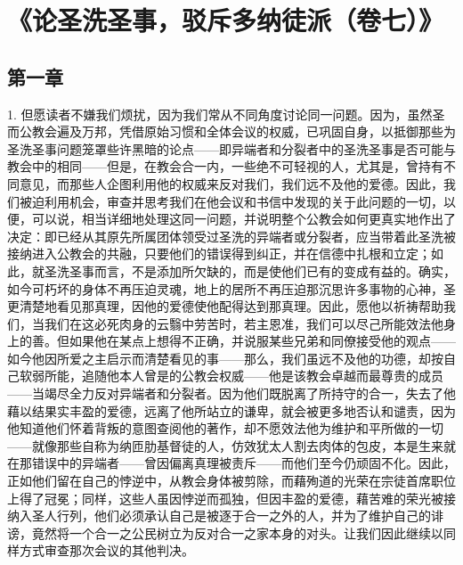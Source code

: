 

\section{《论圣洗圣事，驳斥多纳徒派（卷七）》}

\par


\subsection{第一章}

1. 但愿读者不嫌我们烦扰，因为我们常从不同角度讨论同一问题。因为，虽然圣而公教会遍及万邦，凭借原始习惯和全体会议的权威，已巩固自身，以抵御那些为圣洗圣事问题笼罩些许黑暗的论点——即异端者和分裂者中的圣洗圣事是否可能与教会中的相同——但是，在教会合一内，一些绝不可轻视的人，尤其是，曾持有不同意见，而那些人企图利用他的权威来反对我们，我们远不及他的爱德。因此，我们被迫利用机会，审查并思考我们在他会议和书信中发现的关于此问题的一切，以便，可以说，相当详细地处理这同一问题，并说明整个公教会如何更真实地作出了决定：即已经从其原先所属团体领受过圣洗的异端者或分裂者，应当带着此圣洗被接纳进入公教会的共融，只要他们的错误得到纠正，并在信德中扎根和立定；如此，就圣洗圣事而言，不是添加所欠缺的，而是使他们已有的变成有益的。确实，如今可朽坏的身体不再压迫灵魂，地上的居所不再压迫那沉思许多事物的心神，圣更清楚地看见那真理，因他的爱德使他配得达到那真理。因此，愿他以祈祷帮助我们，当我们在这必死肉身的云翳中劳苦时，若主恩准，我们可以尽己所能效法他身上的善。但如果他在某点上想得不正确，并说服某些兄弟和同僚接受他的观点——如今他因所爱之主启示而清楚看见的事——那么，我们虽远不及他的功德，却按自己软弱所能，追随他本人曾是的公教会权威——他是该教会卓越而最尊贵的成员——当竭尽全力反对异端者和分裂者。因为他们既脱离了所持守的合一，失去了他藉以结果实丰盈的爱德，远离了他所站立的谦卑，就会被更多地否认和谴责，因为他知道他们怀着背叛的意图查阅他的著作，却不愿效法他为维护和平所做的一切——就像那些自称为纳匝肋基督徒的人，仿效犹太人割去肉体的包皮，本是生来就在那错误中的异端者——曾因偏离真理被责斥——而他们至今仍顽固不化。因此，正如他们留在自己的悖逆中，从教会身体被剪除，而藉殉道的光荣在宗徒首席职位上得了冠冕；同样，这些人虽因悖逆而孤独，但因丰盈的爱德，藉苦难的荣光被接纳入圣人行列，他们必须承认自己是被逐于合一之外的人，并为了维护自己的诽谤，竟然将一个合一之公民树立为反对合一之家本身的对头。让我们因此继续以同样方式审查那次会议的其他判决。\par

